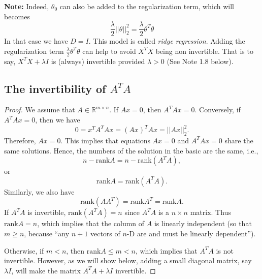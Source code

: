 \documentclass{article}
\begin{document}
\textbf{Note: } Indeed, $\theta_0$ can also be added to the regularization term, which will becomes \[\frac{\lambda}{2}||\theta||_2^2=\frac{\lambda}{2}\theta^T\theta
\]
In that case we have $D=I$. This model is called \emph{ridge regression}. Adding the regularization term $\frac{\lambda}{2}\theta^T\theta$ can help to avoid $X^TX$ being non invertible. That is to say, $X^TX+\lambda I$ is (always) invertible provided $\lambda>0$ (See Note 1.8 below).


\subsection{The invertibility of $A^TA$}
\begin{proof}
We assume that $A\in\mathbb{R}^{m\times{n}}$. If $Ax=0$, then $A^TAx=0$. Conversely, if $A^TAx=0$, then we have
\[
0=x^TA^TAx=(Ax)^TAx=||Ax||_2^2.
\]
Therefore, $Ax=0$. This implies that equations $Ax=0$ and $A^TAx=0$ share the same solutions. Hence, the numbers of the solution in the basic are the same, i.e.,
\[
n-\text{rank}A=n-\text{rank}(A^TA),
\]
or
\[
\text{rank}A=\text{rank}(A^TA).
\]
Similarly, we also have
\[
\text{rank}(AA^T)=\text{rank}A^T=\text{rank}A.
\]
If $A^TA$ is invertible, $\text{rank}(A^TA)=n$ since $A^TA$ is a $n\times{n}$ matrix. Thus $\text{rank}A=n$, which implies that the column of $A$ is linearly independent (so that  $m\geq n$, because ``any $n+1$ vectors of $n$-D are and must be linearly dependent'').

Otherwise, if $m<n$, then $\text{rank}A\leq m<n$, which implies that $A^TA$ is not invertible. However, as we will show below, adding a small diagonal matrix, say $\lambda I$, will make the matrix $A^TA+\lambda I$ invertible.
\end{proof}
\end{document}
